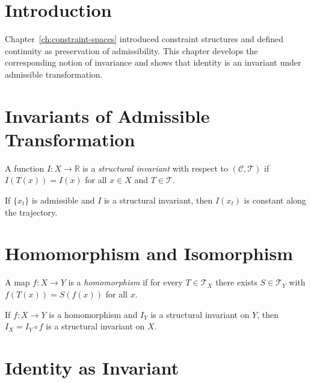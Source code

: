 \documentclass[11pt,openany]{book}
\begin{document}
\section{Introduction}
\label{sec:introduction-invariance}

Chapter~\ref{ch:constraint-spaces} introduced constraint
structures and defined continuity as preservation of
admissibility. This chapter develops the corresponding
notion of invariance and shows that identity is an
invariant under admissible transformation.

\section{Invariants of Admissible Transformation}
\label{sec:invariants}

\begin{definition}
\label{def:structural-invariant}
A function $I : X \to \mathbb{R}$ is a
\emph{structural invariant} with respect to $(\mathcal{C},
\mathcal{T})$ if $I(T(x)) = I(x)$ for all $x \in X$ and
$T \in \mathcal{T}$.
\end{definition}

\begin{proposition}
\label{prop:trajectory-invariance}
If $\{x_t\}$ is admissible and $I$ is a structural
invariant, then $I(x_t)$ is constant along the trajectory.
\end{proposition}

\section{Homomorphism and Isomorphism}
\label{sec:homomorphism}

\begin{definition}[Homomorphism]
\label{def:homomorphism}
A map $f : X \to Y$ is a \emph{homomorphism} if for every
$T \in \mathcal{T}_X$ there exists $S \in \mathcal{T}_Y$
with $f(T(x)) = S(f(x))$ for all $x$.
\end{definition}

\begin{proposition}
\label{prop:homomorphism}
If $f : X \to Y$ is a homomorphism and $I_Y$ is a
structural invariant on $Y$, then $I_X = I_Y \circ f$ is a
structural invariant on $X$.
\end{proposition}

\section{Identity as Invariant}
\label{sec:identity-invariant}
\end{document}
